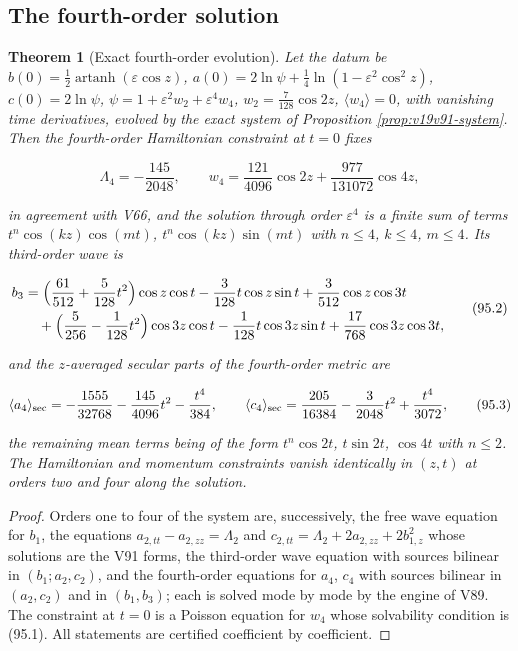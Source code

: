 \documentclass[11pt]{article}
\newtheorem{theorem}{Theorem}[section]
\theoremstyle{remark}
\begin{document}
\subsection{The fourth-order solution}

\begin{theorem}[Exact fourth-order evolution]
\label{thm:v19v92-solution}
Let the datum be \(b(0)=\tfrac12\operatorname{artanh}(\varepsilon\cos z)\),
\(a(0)=2\ln\psi+\tfrac14\ln(1-\varepsilon^2\cos^2z)\), \(c(0)=2\ln\psi\),
\(\psi=1+\varepsilon^2w_2+\varepsilon^4w_4\), \(w_2=\tfrac7{128}\cos2z\),
\(\langle w_4\rangle=0\), with vanishing time derivatives, evolved by
the exact system of Proposition \ref{prop:v19v91-system}.  Then the
fourth-order Hamiltonian constraint at \(t=0\) fixes

\[
 \Lambda_4=-\frac{145}{2048},\qquad
 w_4=\frac{121}{4096}\cos2z+\frac{977}{131072}\cos4z,                  \tag{95.1}
\]

in agreement with V66, and the solution through order \(\varepsilon^4\)
is a finite sum of terms \(t^n\cos(kz)\cos(mt)\), \(t^n\cos(kz)\sin(mt)\)
with \(n\leq4\), \(k\leq4\), \(m\leq4\).  Its third-order wave is

\[
\begin{aligned}
 b_3&=\Bigl(\frac{61}{512}+\frac5{128}t^2\Bigr)\cos z\cos t-\frac3{128}t\cos z\sin t
     +\frac3{512}\cos z\cos3t\\
    &\quad+\Bigl(\frac5{256}-\frac1{128}t^2\Bigr)\cos3z\cos t-\frac1{128}t\cos3z\sin t
     +\frac{17}{768}\cos3z\cos3t,
\end{aligned}                                                          \tag{95.2}
\]

and the \(z\)-averaged secular parts of the fourth-order metric are

\[
 \langle a_4\rangle_{\rm sec}=-\frac{1555}{32768}-\frac{145}{4096}t^2-\frac{t^4}{384},\qquad
 \langle c_4\rangle_{\rm sec}=\frac{205}{16384}-\frac3{2048}t^2+\frac{t^4}{3072},   \tag{95.3}
\]

the remaining mean terms being of the form \(t^n\cos2t\), \(t\sin2t\),
\(\cos4t\) with \(n\leq2\).  The Hamiltonian and momentum constraints
vanish identically in \((z,t)\) at orders two and four along the
solution.
\end{theorem}

\begin{proof}
Orders one to four of the system are, successively, the free wave
equation for \(b_1\), the equations \(a_{2,tt}-a_{2,zz}=\Lambda_2\)
and \(c_{2,tt}=\Lambda_2+2a_{2,zz}+2b_{1,z}^2\) whose solutions are
the V91 forms, the third-order wave equation with sources bilinear in
\((b_1;a_2,c_2)\), and the fourth-order equations for \(a_4\), \(c_4\)
with sources bilinear in \((a_2,c_2)\) and in \((b_1,b_3)\); each is
solved mode by mode by the engine of V89.  The constraint at \(t=0\)
is a Poisson equation for \(w_4\) whose solvability condition is
(95.1).  All statements are certified coefficient by coefficient.
\end{proof}
\end{document}
